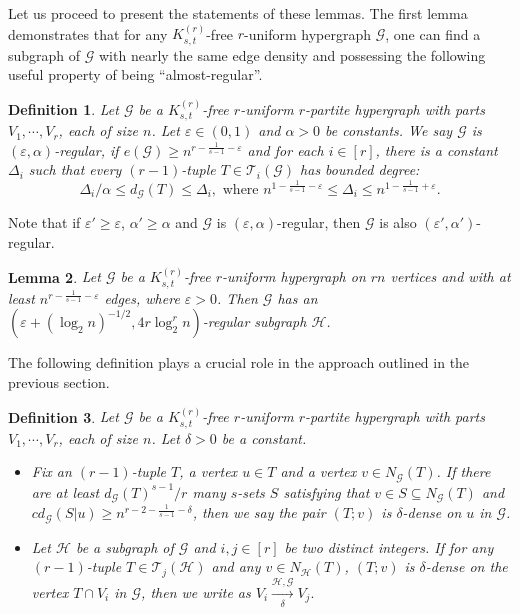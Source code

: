 \documentclass[11pt]{article}
\newtheorem{dfn}{Definition}[section]
\newtheorem{lem}[dfn]{Lemma}
\begin{document}
Let us proceed to present the statements of these lemmas.
The first lemma demonstrates that for any $K_{s,t}^{(r)}$-free $r$-uniform hypergraph $\mathcal G$,
one can find a subgraph of $\mathcal G$ with nearly the same edge density and possessing the following useful property of being ``almost-regular''.

\begin{dfn} \label{def: regular}
Let $\mathcal G$ be a $K_{s,t}^{(r)}$-free $r$-uniform $r$-partite hypergraph with parts $V_1,\cdots , V_{r }$, each of size $n$.
Let $\varepsilon\in (0,1)$ and $\alpha>0$ be constants.
We say $\mathcal G$ is {\it $( \varepsilon,\alpha)$-regular}, if $e(\mathcal G)\ge n^{r-\frac{1}{s-1}- \varepsilon}$ and for each $i\in [r]$,  there is a constant $\Delta_i$ such that every $(r-1)$-tuple $T\in \mathcal T_i(\mathcal G)$ has bounded degree:
 $$\Delta_i/\alpha \le d_{\mathcal G}(T)\le \Delta_i, \text{ where } n^{1-\frac{1}{s-1}- \varepsilon} \le \Delta_i \le n^{1-\frac{1}{s-1}+  \varepsilon }.$$
\end{dfn}
Note that if $\varepsilon'\ge \varepsilon$, $\alpha'\ge \alpha $ and $\mathcal G$ is $( \varepsilon,\alpha)$-regular,
then $\mathcal G$ is also $( \varepsilon',\alpha')$-regular.


\begin{lem}\label{lem: find regular subgraph}
Let $\mathcal G$ be a  $K_{s,t}^{(r)}$-free $r$-uniform hypergraph on $rn$ vertices and with at least $n^{r-\frac{1}{s-1}- \varepsilon }$ edges, where $\varepsilon>0$. Then $\mathcal G $ has an $\left(\varepsilon+(\log_2n)^{-1/2},4r\log_2^r n\right)$-regular subgraph $\mathcal H$.
\end{lem}

The following definition plays a crucial role in the approach outlined in the previous section.

\begin{dfn}\label{Def:delta-dense}
Let $\mathcal G$ be a $K_{s,t}^{(r)}$-free $r$-uniform $r$-partite  hypergraph with parts $V_1,\cdots , V_{r }$, each of size $n$.
Let $\delta>0$ be a constant.
\begin{itemize}
\item Fix an $(r-1)$-tuple $T$, a vertex $u\in T$ and a vertex $v\in N_{\mathcal G}(T)$. If there are at least $ d_{\mathcal G}(T)^{s-1}/r$ many $s$-sets $S$ satisfying that $v\in S\subseteq N_{\mathcal G}(T)$ and $cd_{\mathcal G}(S|u)\ge n^{r-2-\frac{1}{s-1}-\delta}$, then we say the pair {\it $(T; v)$ is $ \delta$-dense on $u$} in $\mathcal G$.
\item Let $\mathcal H$ be a subgraph of $\mathcal G$ and $i,j\in [r]$ be two distinct integers. If for any $(r-1)$-tuple $T\in \mathcal T_j(\mathcal H)$ and any $v\in N_{\mathcal H}(T)$, $(T; v)$ is $\delta$-dense on the vertex $T\cap V_i$ in $\mathcal G$, then
we write as $V_i  \xrightarrow[\delta]{\mathcal H, \mathcal G }  V_j .$
\end{itemize}
\end{dfn}
\end{document}
